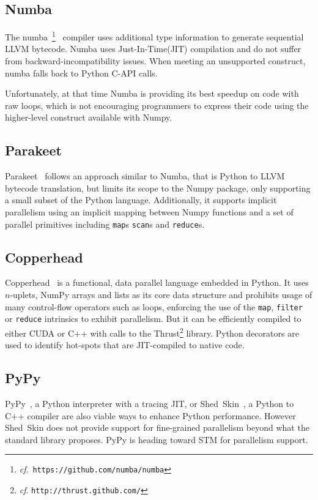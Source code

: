 \documentclass[10pt, preprint]{sigplanconf}
\begin{document}
\subsection{Numba}


The numba~\footnote{\emph{cf}.\ \texttt{https://github.com/numba/numba}}~\cite{numba}
compiler uses additional type information to generate sequential LLVM bytecode.
Numba uses Just-In-Time(JIT) compilation and do not suffer from
backward-incompatibility issues. When meeting an unsupported construct, numba
falls back to Python C-API calls.

Unfortunately, at that time Numba is providing its best speedup on code with 
raw loops, which is not encouraging programmers to express their code using 
the higher-level construct available with Numpy.

\subsection{Parakeet}

Parakeet~\cite{parakeet2012} follows an approach similar to Numba, that is
Python to LLVM bytecode translation, but limits its scope to the Numpy package,
only supporting a small subset of the Python language. Additionally, it supports
implicit parallelism using an implicit mapping between Numpy functions and a set
of parallel primitives including \texttt{map}s \texttt{scan}s and
\texttt{reduce}s. 

\subsection{Copperhead}

Copperhead~\cite{copperhead2011} is a functional, data parallel language
embedded in Python. It uses $n$-uplets, NumPy arrays and lists as its core data
structure and prohibits usage of many control-flow operators such as loops,
enforcing the use of the \texttt{map}, \texttt{filter} or \texttt{reduce}
intrinsics to exhibit parallelism. But it can be efficiently compiled to either
CUDA or C++ with calls to the Thrust\footnote{\emph{cf}.
\texttt{http://thrust.github.com/}} library. Python decorators are used to
identify hot-spots that are JIT-compiled to native code.

\subsection{PyPy}

PyPy~\cite{pypy2009}, a Python interpreter with a tracing JIT, or
Shed~Skin~\cite{shedskin2006}, a Python to C++ compiler are also viable ways to
enhance Python performance. However Shed~Skin does not provide support for
fine-grained parallelism beyond what the standard library proposes. PyPy is
heading toward STM for parallelism support.
\end{document}
